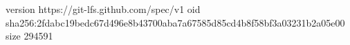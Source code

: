 version https://git-lfs.github.com/spec/v1
oid sha256:2fdabc19bedc67d496e8b43700aba7a67585d85cd4b8f58bf3a03231b2a05e00
size 294591
